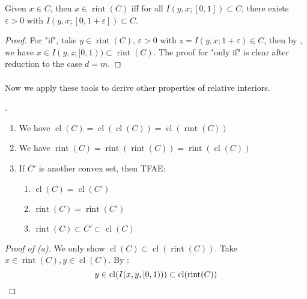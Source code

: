 \begin{prop}
	\label{prop:012-prolongation}
	Given $x\in C$, then $x\in \operatorname{rint}(C)$ iff for all $I(y,x;[0,1])\subset C$, there exists $\varepsilon>0$ with $I(y,x;[0,1+\varepsilon ])\subset C$.
\end{prop}

\begin{proof}
	For "if", take $y\in \operatorname{rint}(C)$, $\varepsilon>0$ with $z=I(y,x;1+\varepsilon )\in C$, then by , we have $x\in I(y,z;[0,1))\subset \operatorname{rint}(C)$.	The proof for "only if" is clear after reduction to the case $d=m$.
\end{proof}

\paragraph{}Now we apply these tools to derive other properties of relative interiors.

\begin{prop}.
	\label{prop:012-cl-rint-basic}
	\begin{enumerate}[label=(\alph*)]
		\item We have $\operatorname{cl}(C)=\operatorname{cl}(\operatorname{cl}(C))=\operatorname{cl}(\operatorname{rint}(C))$
		\item We have $\operatorname{rint}(C)=\operatorname{rint}(\operatorname{rint}(C))=\operatorname{rint}(\operatorname{cl}(C))$
		\item If $C'$ is another convex set, then TFAE:
		      \begin{enumerate}[label=(\roman*)]
			      \item $\operatorname{cl}(C)=\operatorname{cl}(C')$
			      \item $\operatorname{rint}(C)=\operatorname{rint}(C')$
			      \item $\operatorname{rint}(C)\subset C'\subset\operatorname{cl}(C)$
		      \end{enumerate}
	\end{enumerate}
\end{prop}

\begin{proof}[Proof of (a)]
	We only show $\operatorname{cl}(C)\subset \operatorname{cl}(\operatorname{rint}(C))$. Take $x\in \operatorname{rint}(C),y\in \operatorname{cl}(C)$. By :
	\[
		y\in \operatorname{cl}(I(x,y,[0, 1)))\subset \operatorname{cl}(\operatorname{rint}(C))\qedhere{}
	\]
\end{proof}

